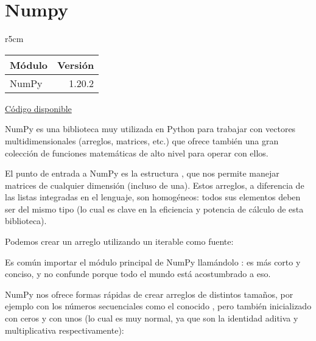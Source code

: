 

\chapter{Numpy} \label{ch:numpy}

\begin{wraptable}{r}{5cm}
\begin{modulesinfo}
\begin{center}
{\small
    \begin{tabular}{l r}
        \toprule
        \textbf{Módulo} & \textbf{Versión} \\
        \midrule
        NumPy & 1.20.2 \\
        \bottomrule
    \end{tabular}
    \vspace{0.75em}
    
    \href{https://github.com/facundobatista/libro-pyciencia/tree/master/código/numpy/}{Código disponible}
}
\end{center}
\end{modulesinfo}
\end{wraptable}

NumPy es una biblioteca muy utilizada en Python para trabajar con vectores multidimensionales (arreglos, matrices, etc.) que ofrece también una gran colección de funciones matemáticas de alto nivel para operar con ellos.

El punto de entrada a NumPy es la estructura , que nos permite manejar matrices de cualquier dimensión (incluso de una). Estos arreglos, a diferencia de las listas integradas en el lenguaje, son homogéneos: todos sus elementos deben ser del mismo tipo (lo cual es clave en la eficiencia y potencia de cálculo de esta biblioteca).

Podemos crear un arreglo utilizando un iterable como fuente:


\begin{info}
Es común importar el módulo principal de NumPy llamándolo : es más corto y conciso, y no confunde porque todo el mundo está acostumbrado a eso.
\end{info}

NumPy nos ofrece formas rápidas de crear arreglos de distintos tamaños, por ejemplo con los números secuenciales como el conocido , pero también inicializado con ceros y con unos (lo cual es muy normal, ya que son la identidad aditiva y multiplicativa respectivamente):


